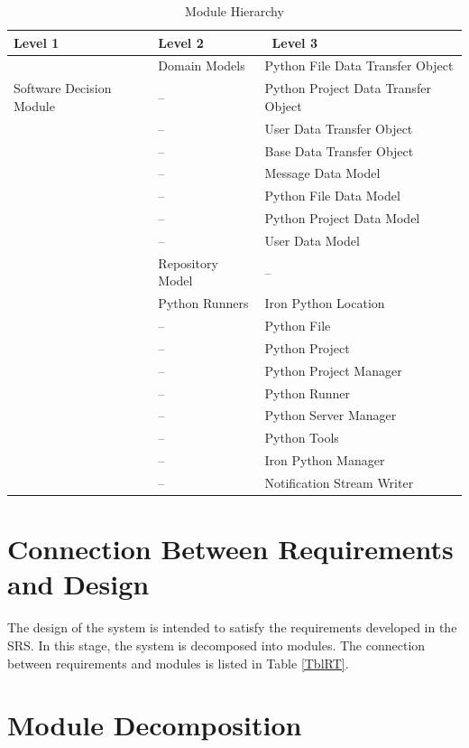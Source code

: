 \documentclass[12pt, titlepage]{article}
\begin{document}
\begin{table}[h!]
\centering
\begin{tabular}{p{} p{} p{}}
\toprule
    \textbf{Level 1} & \textbf{Level 2} &\ \textbf{Level 3}\\
\midrule
    \multirow{3}{0.3\textwidth}{Software Decision Module} & Domain Models & Python File Data Transfer Object\\
    & -- & Python Project Data Transfer Object\\
    & -- & User Data Transfer Object\\
    & -- & Base Data Transfer Object\\
    & -- & Message Data Model\\
    & -- & Python File Data Model\\
    & -- & Python Project Data Model\\
    & -- & User Data Model\\
    & Repository Model & --\\
    & Python Runners & Iron Python Location\\
    & -- & Python File\\
    & -- & Python Project\\
    & -- & Python Project Manager\\
    & -- & Python Runner\\
    & -- & Python Server Manager\\
    & -- & Python Tools\\
    & -- & Iron Python Manager\\
    & -- & Notification Stream Writer\\
\bottomrule
\end{tabular}
\caption{Module Hierarchy}
\label{TblMH}
\end{table}

\section{Connection Between Requirements and Design} \label{SecConnection}

The design of the system is intended to satisfy the requirements developed in
the SRS. In this stage, the system is decomposed into modules. The connection
between requirements and modules is listed in Table \ref{TblRT}.

\section{Module Decomposition} \label{SecMD}
\end{document}
